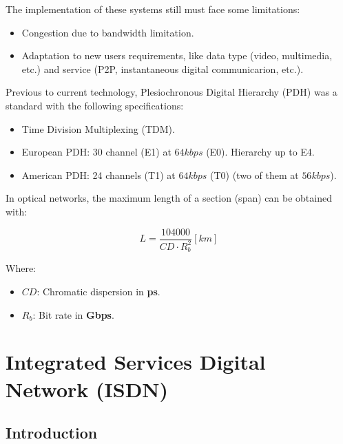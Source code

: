 \documentclass[../main.tex]{subfiles}
\begin{document}
The implementation of these systems still must face some limitations:

\begin{itemize}
	\item Congestion due to bandwidth limitation.
	\item Adaptation to new users requirements, like data type (video, multimedia, etc.) and service (P2P, instantaneous digital communicarion, etc.).
\end{itemize}

Previous to current technology, Plesiochronous Digital Hierarchy (PDH) was a standard with the following specifications:

\begin{itemize}
	\item Time Division Multiplexing (TDM).
	\item European PDH: 30 channel (E1) at $64 kbps$ (E0). Hierarchy up to E4.
	\item American PDH: 24 channels (T1) at $64 kbps$ (T0) (two of them at $56 kbps$).
\end{itemize}

In optical networks, the maximum length of a section (span) can be obtained with:

$$
	L = \frac {104 000} {CD \cdot R_{b}^2} [km]
$$

Where:

\begin{itemize}
	\item $CD$: Chromatic dispersion in \textbf{ps}.
	\item $R_b$: Bit rate in \textbf{Gbps}.
\end{itemize}

\section{Integrated Services Digital Network (ISDN)}

\subsection{Introduction}
\end{document}
